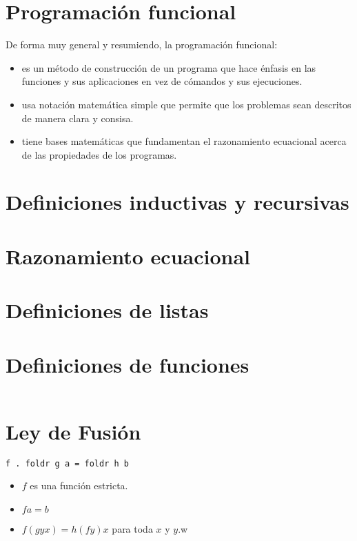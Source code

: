 \section{Programación funcional}
De forma muy general y resumiendo, la programación funcional:
\begin{itemize}
    \item es un método de construcción de un programa que hace énfasis en las funciones y sus aplicaciones
    en vez de cómandos y sus ejecuciones.

    \item usa notación matemática simple que permite que los problemas sean descritos de manera clara
    y consisa.
    \item tiene bases matemáticas que fundamentan el razonamiento ecuacional acerca de las propiedades de
    los programas.
\end{itemize}

\section{Definiciones inductivas y recursivas}

\section{Razonamiento ecuacional}


\section{Definiciones de listas}

\section{Definiciones de funciones}
\inputminted{haskell}{definiciones/map.hs}



\section{Ley de Fusión}

\begin{verbatim}
f . foldr g a = foldr h b
\end{verbatim}

\begin{itemize}
    \item $f$ es una función estricta.
    \item $f a = b$
    \item $f (g y x) = h (f y) x$ para toda $x$ y $y$.w
\end{itemize}

